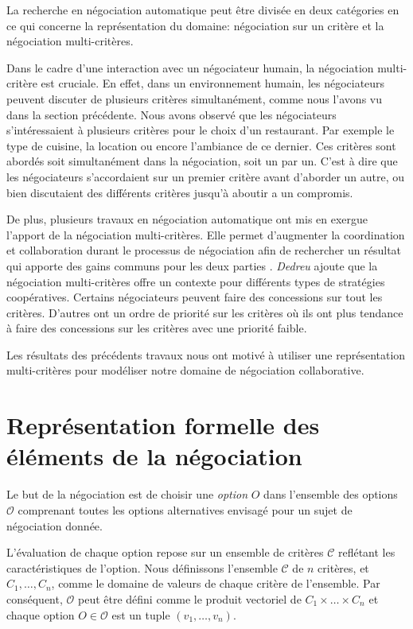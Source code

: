 		La recherche en négociation automatique peut être divisée en deux catégories en ce qui concerne la représentation du domaine: négociation sur un critère et la négociation multi-critères. %
		
		Dans le cadre d'une interaction avec un négociateur humain, la négociation multi-critère est cruciale. En effet, dans un environnement humain, les négociateurs peuvent discuter de plusieurs critères simultanément, comme nous l'avons vu dans la section précédente.  Nous avons observé que les négociateurs s'intéressaient à plusieurs critères pour le choix d'un restaurant. Par exemple le type de cuisine, la location ou encore l'ambiance de ce dernier. Ces critères sont abordés soit simultanément dans la négociation, soit un par un. C'est à dire que les négociateurs s'accordaient sur un premier critère avant d'aborder un autre, ou bien discutaient des différents critères jusqu'à aboutir a un compromis.
		
		De plus, plusieurs travaux en négociation automatique ont mis en exergue l'apport de la négociation multi-critères. Elle permet d'augmenter la coordination et collaboration durant le processus de négociation afin de rechercher un résultat qui apporte des gains communs pour les deux parties \cite{jonker2007agent,lai2008decentralized,lai2004literature}. \emph{Dedreu} \cite{de1995impact} ajoute que la négociation multi-critères offre un contexte pour différents types de stratégies coopératives. Certains négociateurs peuvent faire des concessions sur tout les critères. D'autres ont un ordre de priorité sur les critères où ils ont plus tendance à faire des concessions sur les critères avec une priorité faible. 
	
		Les résultats des précédents travaux nous ont motivé à utiliser une représentation multi-critères pour modéliser notre domaine de négociation collaborative. 
		
		\section{Représentation formelle des éléments de la négociation}	
		Le but de la négociation est de choisir une \textit{option} $O$ dans l'ensemble des options $\mathcal{O}$ comprenant toutes les options alternatives envisagé pour un sujet de négociation donnée. 
		
		L'évaluation de chaque option repose sur un ensemble de critères $\mathcal{C}$ reflétant les caractéristiques de l'option. Nous définissons l'ensemble $\mathcal{C}$ de $n$ critères, et $C_1,\ldots,C_n$, comme le domaine de valeurs de chaque critère de l'ensemble. 
		Par conséquent, $\mathcal{O}$ peut être défini comme le produit vectoriel de  $C_1\times\ldots\times C_n$ et chaque option $O \in \mathcal{O}$ est un tuple $(v_1,\ldots,v_n)$. 
		
